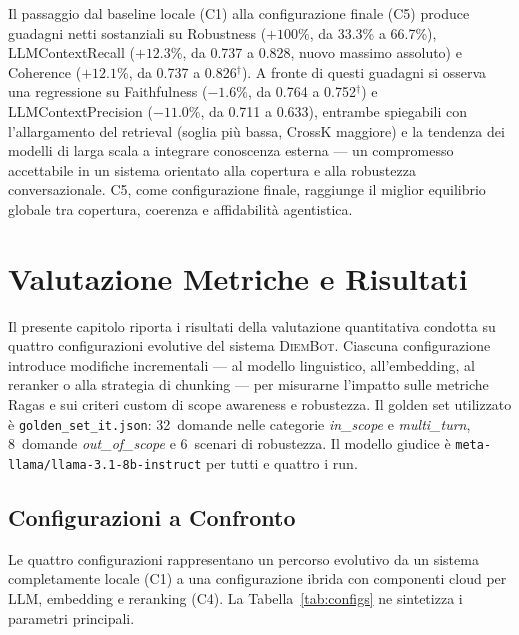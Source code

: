 \documentclass[11pt,a4paper]{article}
\newcommand{\code}[1]{\texttt{\small#1}}
\newcommand{\sys}{\textsc{DiemBot}}
\begin{document}
Il passaggio dal baseline locale (C1) alla configurazione finale (C5) produce
guadagni netti sostanziali su Robustness ($+100\%$, da 33.3\% a 66.7\%),
LLMContextRecall ($+12.3\%$, da 0.737 a 0.828, nuovo massimo assoluto) e
Coherence ($+12.1\%$, da 0.737 a 0.826$^\dagger$). A fronte di questi guadagni
si osserva una regressione su Faithfulness ($-1.6\%$, da 0.764 a 0.752$^\dagger$)
e LLMContextPrecision ($-11.0\%$, da 0.711 a 0.633), entrambe spiegabili con
l'allargamento del retrieval (soglia più bassa, CrossK maggiore) e la tendenza
dei modelli di larga scala a integrare conoscenza esterna --- un compromesso
accettabile in un sistema orientato alla copertura e alla robustezza conversazionale.
C5, come configurazione finale, raggiunge il miglior equilibrio globale tra copertura,
coerenza e affidabilità agentistica.

\section{Valutazione Metriche e Risultati}
\label{sec:eval_results}

Il presente capitolo riporta i risultati della valutazione quantitativa condotta su
quattro configurazioni evolutive del sistema \sys{}. Ciascuna configurazione introduce
modifiche incrementali --- al modello linguistico, all'embedding, al reranker o alla
strategia di chunking --- per misurarne l'impatto sulle metriche Ragas e sui criteri
custom di scope awareness e robustezza. Il golden set utilizzato è
\code{golden\_set\_it.json}: 32~domande nelle categorie \emph{in\_scope} e
\emph{multi\_turn}, 8~domande \emph{out\_of\_scope} e 6~scenari di robustezza.
Il modello giudice è \code{meta-llama/llama-3.1-8b-instruct} per tutti e quattro i run.

\subsection{Configurazioni a Confronto}
\label{subsec:eval_configs}

Le quattro configurazioni rappresentano un percorso evolutivo da un sistema
completamente locale (C1) a una configurazione ibrida con componenti cloud per LLM,
embedding e reranking (C4). La Tabella~\ref{tab:configs} ne sintetizza i parametri
principali.
\end{document}
